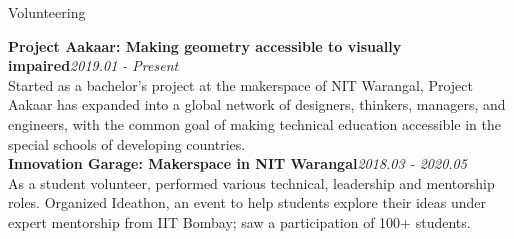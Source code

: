 \documentclass{resume} %
\begin{document}








\begin{rSection}{Volunteering}

{\bf Project Aakaar: Making geometry accessible to visually impaired}\hfill {\em 2019.01 - Present}\\
Started as a bachelor's project at the makerspace of NIT Warangal, Project Aakaar has expanded into a global network of designers, thinkers, managers, and engineers, with the common goal of making technical education accessible in the special schools of developing countries. \\ 

{\bf Innovation Garage: Makerspace in NIT Warangal}\hfill{\em 2018.03 - 2020.05}\\
As a student volunteer, performed various technical, leadership and mentorship roles.  Organized Ideathon, an event to help students explore their ideas under expert mentorship from IIT Bombay; saw a participation of 100+ students.

\end{rSection}
\end{document}
